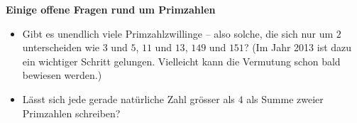\textbf{Einige offene Fragen rund um Primzahlen}

\begin{itemize}
    \item Gibt es unendlich viele Primzahlzwillinge -- also solche, die sich nur um \(2\) unterscheiden wie \(3\) und \(5\), \(11\) und \(13\), \(149\) und \(151\)? (Im Jahr 2013 ist dazu ein wichtiger Schritt gelungen. Vielleicht kann die Vermutung schon bald bewiesen werden.)

    \item Lässt sich jede gerade natürliche Zahl grösser als \(4\) als Summe zweier Primzahlen schreiben?
\end{itemize}



























